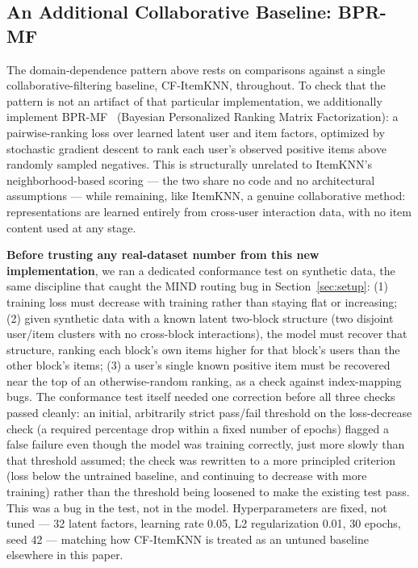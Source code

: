 \documentclass[11pt,a4paper]{article}
\begin{document}
\subsection{An Additional Collaborative Baseline: BPR-MF}
\label{sec:bprmf}

The domain-dependence pattern above rests on comparisons against a
single collaborative-filtering baseline, CF-ItemKNN, throughout. To
check that the pattern is not an artifact of that particular
implementation, we additionally implement BPR-MF~\cite{rendle2009}
(Bayesian Personalized Ranking Matrix Factorization): a pairwise-ranking
loss over learned latent user and item factors, optimized by stochastic
gradient descent to rank each user's observed positive items above
randomly sampled negatives. This is structurally unrelated to
ItemKNN's neighborhood-based scoring --- the two share no code and no
architectural assumptions --- while remaining, like ItemKNN, a genuine
collaborative method: representations are learned entirely from
cross-user interaction data, with no item content used at any stage.

\textbf{Before trusting any real-dataset number from this new
implementation}, we ran a dedicated conformance test on synthetic data,
the same discipline that caught the MIND routing bug in
Section~\ref{sec:setup}: (1) training loss must decrease with training
rather than staying flat or increasing; (2) given synthetic data with a
known latent two-block structure (two disjoint user/item clusters with
no cross-block interactions), the model must recover that structure,
ranking each block's own items higher for that block's users than the
other block's items; (3) a user's single known positive item must be
recovered near the top of an otherwise-random ranking, as a check
against index-mapping bugs. The conformance test itself needed one
correction before all three checks passed cleanly: an initial,
arbitrarily strict pass/fail threshold on the loss-decrease check (a
required percentage drop within a fixed number of epochs) flagged a
false failure even though the model was training correctly, just more
slowly than that threshold assumed; the check was rewritten to a more
principled criterion (loss below the untrained baseline, and continuing
to decrease with more training) rather than the threshold being loosened
to make the existing test pass. This was a bug in the test, not in the
model. Hyperparameters are fixed, not tuned --- 32 latent factors,
learning rate 0.05, L2 regularization 0.01, 30 epochs, seed 42 ---
matching how CF-ItemKNN is treated as an untuned baseline elsewhere in
this paper.
\end{document}
